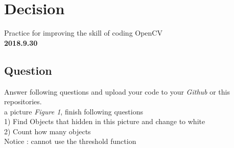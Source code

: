 \section*{Decision} 

Practice for improving the skill of coding OpenCV\\

\textbf{2018.9.30}

\subsection*{Question}

Answer following questions and upload your code to your \emph{Github} or this repositories.\\

 a picture \emph{Figure 1}, finish following questions\\

1) Find Objects that hidden in this picture and change to white\\

2) Count how many objects\\

\noindent\textsf{Notice} : cannot use the threshold function
\clearpage